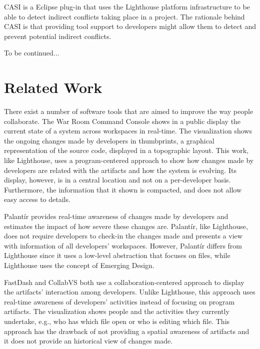 \documentclass[10pt, conference, compsocconf]{IEEEtran}
\begin{document}
CASI\cite{Servant:2010} is a Eclipse plug-in that uses the Lighthouse platform infrastructure to be able to detect indirect conflicts taking place in a project. The rationale behind CASI is that providing tool support to developers might allow them to detect and prevent potential indirect conflicts.

To be continued... 

\section{Related Work}

There exist a number of software tools that are aimed to improve the way people collaborate. The War Room Command Console \cite{Reilly:2005} shows in a public display the current state of a system across workspaces in real-time. The visualization shows the ongoing changes made by developers in thumbprints, a graphical representation of the source code, displayed in a topographic layout. This work, like Lighthouse, uses a program-centered approach to show how changes made by developers are related with the artifacts and how the system is evolving. Its display, however, is in a central location and not on a per-developer basis. Furthermore, the information that it shown is compacted, and does not allow easy access to details.

Palant\'{i}r \cite{Sarma:2003:PRA} provides real-time awareness of changes made by developers and estimates the impact of how severe these changes are. Palant\'{i}r, like Lighthouse, does not require developers to check-in the changes made and presents a view with information of all developers' workspaces. However, Palant\'{i}r differs from Lighthouse since it uses a low-level abstraction that focuses on files, while Lighthouse uses the concept of Emerging Design.

FastDash \cite{Biehl:2007} and CollabVS \cite{Hegde:2008} both use a collaboration-centered approach to display the artifacts' interaction among developers. Unlike Lighthouse, this approach uses real-time awareness of developers' activities instead of focusing on program artifacts. The visualization shows people and the activities they currently undertake, e.g., who has which file open or who is editing which file. This approach has the drawback of not providing a spatial awareness of artifacts and it does not provide an historical view of changes made.
\end{document}
